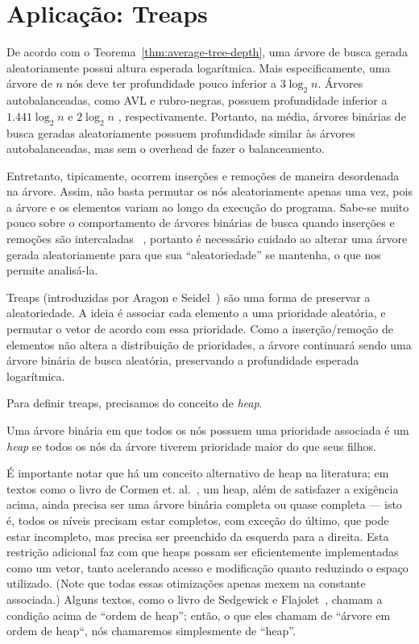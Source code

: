 \section{Aplicação: Treaps}
\label{sec:treaps}

De acordo com o Teorema~\ref{thm:average-tree-depth},
uma árvore de busca gerada aleatoriamente
possui altura esperada logarítmica.
Mais especificamente,
uma árvore de $n$ nós
deve ter profundidade pouco inferior a $3 \log_2 n$.
Árvores autobalanceadas,
como AVL e rubro-negras,
possuem profundidade inferior a $1.441 \log_2 n$ \cite[p.~460]{Knuth1998}
e $2 \log_2 n$ \cite[p.~309]{CormenLeisersonRivestStein2009},
respectivamente.
Portanto,
na média,
árvores binárias de busca geradas aleatoriamente
possuem profundidade similar às árvores autobalanceadas,
mas sem o overhead de fazer o balanceamento.

Entretanto,
tipicamente, ocorrem inserções e remoções de maneira desordenada na árvore.
Assim,
não basta permutar os nós aleatoriamente apenas uma vez,
pois a árvore e os elementos variam ao longo da execução do programa.
Sabe-se muito pouco sobre o comportamento de árvores binárias de busca
quando inserções e remoções são intercaladas%
~\cite[p.~300]{CormenLeisersonRivestStein2009},
portanto é necessário cuidado ao alterar uma árvore gerada aleatoriamente
para que sua ``aleatoriedade'' se mantenha,
o que nos permite analisá-la.

Treaps
(introduzidas por Aragon e Seidel~\cite{AragonSeidel1989})
são uma forma de preservar a aleatoriedade.
A ideia é associar cada elemento a uma prioridade aleatória,
e permutar o vetor de acordo com essa prioridade.
Como a inserção/remoção de elementos
não altera a distribuição de prioridades,
a árvore continuará sendo uma árvore binária de busca aleatória,
preservando a profundidade esperada logarítmica.

Para definir treaps, precisamos do conceito de \emph{heap}.

\begin{definition}
    Uma árvore binária em que todos os nós possuem uma prioridade associada
    é um \emph{heap}
    se todos os nós da árvore tiverem prioridade maior do que seus filhos.
\end{definition}

É importante notar que há um conceito alternativo de heap na literatura;
em textos como o livro de Cormen et. al.~\cite[p.~152]{CormenLeisersonRivestStein2009},
um heap, além de satisfazer a exigência acima,
ainda precisa ser uma árvore binária completa ou quase completa
--- isto é, todos os níveis precisam estar completos,
com exceção do último, que pode estar incompleto,
mas precisa ser preenchido da esquerda para a direita.
Esta restrição adicional
faz com que heaps possam ser eficientemente implementadas como um vetor,
tanto acelerando acesso e modificação quanto reduzindo o espaço utilizado.
(Note que todas essas otimizações apenas mexem na constante associada.)
Alguns textos, como o livro de Sedgewick e Flajolet~\cite[p.~362]{SedgewickFlajolet2013},
chamam a condição acima de ``ordem de heap'';
então, o que eles chamam de ``árvore em ordem de heap``,
nós chamaremos simplesmente de ``heap''.

